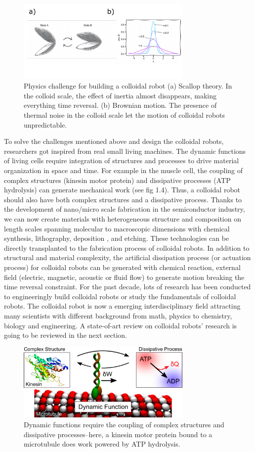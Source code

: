 \begin{figure}
\centering
\includegraphics[width=8.5cm]{figures/1_3.pdf}
\caption{Physics challenge for building a colloidal robot (a) Scallop theory. In the colloid scale, the effect of inertia almost disappears, making everything time reversal. (b) Brownian motion. The presence of thermal noise in the colloid scale let the motion of colloidal robots unpredictable.}
\label{fig:1.3}
\end{figure}
To solve the  challenges mentioned above and design the colloidal robots, researchers got inspired from real small living  machines. The dynamic functions of living cells require integration of structures and processes to drive material organization in space and time. For example in the muscle cell,  the coupling of complex structures (kinesin motor protein) and dissipative processes (ATP hydrolysis) can generate mechanical work (see fig 1.4). Thus, a colloidal robot should also have both complex structures and a dissipative process. Thanks to the development of nano/micro scale fabrication in the semiconductor industry, we can now create materials with heterogeneous structure and composition on length scales spanning molecular to macroscopic dimensions with chemical synthesis, lithography, deposition , and etching. These technologies can be directly transplanted to the fabrication process of colloidal robots. In addition to structural and material complexity, the artificial dissipation process (or actuation process) for colloidal robots  can be generated  with chemical reaction, external field (electric, magnetic, acoustic or fluid flow) to generate motion breaking the time reversal constraint. For the past decade, lots of research has been conducted to engineeringly build colloidal robots  or study the fundamentals of colloidal robots. The colloidal robot is now a emerging interdisciplinary field attracting many scientists with different background from math, physics to chemistry, biology and engineering. A state-of-art  review on colloidal robots' research is going to be reviewed in the next section.
\begin{figure}
\centering
\includegraphics[width=8.5cm]{figures/1_4.png}
\caption{Dynamic functions require the coupling of complex structures and dissipative processes–here, a kinesin motor protein bound to a microtubule  does work powered by ATP hydrolysis.}
\label{fig:1.4}
\end{figure}


